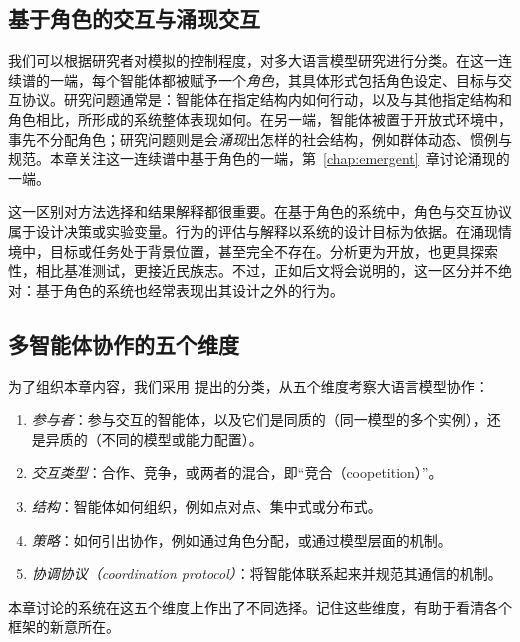 \subsection{基于角色的交互与涌现交互}
我们可以根据研究者对模拟的控制程度，对多大语言模型研究进行分类。在这一连续谱的一端，每个智能体都被赋予一个\emph{角色}，其具体形式包括角色设定、目标与交互协议。研究问题通常是：智能体在指定结构内如何行动，以及与其他指定结构和角色相比，所形成的系统整体表现如何。在另一端，智能体被置于开放式环境中，事先不分配角色；研究问题则是会\emph{涌现}出怎样的社会结构，例如群体动态、惯例与规范。本章关注这一连续谱中基于角色的一端，第~\ref{chap:emergent}~章讨论涌现的一端。

这一区别对方法选择和结果解释都很重要。在基于角色的系统中，角色与交互协议属于设计决策或实验变量。行为的评估与解释以系统的设计目标为依据。在涌现情境中，目标或任务处于背景位置，甚至完全不存在。分析更为开放，也更具探索性，相比基准测试，更接近民族志。不过，正如后文将会说明的，这一区分并不绝对：基于角色的系统也经常表现出其设计之外的行为。

\subsection{多智能体协作的五个维度} \label{fivedimensions}
为了组织本章内容，我们采用 \citet{tran2025multi} 提出的分类，从五个维度考察大语言模型协作：
\begin{enumerate}
    \item \emph{参与者}：参与交互的智能体，以及它们是同质的（同一模型的多个实例），还是异质的（不同的模型或能力配置）。
    \item \emph{交互类型}：合作、竞争，或两者的混合，即“竞合（coopetition）”。
    \item \emph{结构}：智能体如何组织，例如点对点、集中式或分布式。
    \item \emph{策略}：如何引出协作，例如通过角色分配，或通过模型层面的机制。
    \item \emph{协调协议（coordination protocol）}：将智能体联系起来并规范其通信的机制。
\end{enumerate}
本章讨论的系统在这五个维度上作出了不同选择。记住这些维度，有助于看清各个框架的新意所在。

